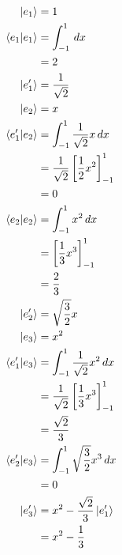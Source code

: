 \documentclass{article}
\begin{document}
\subsection{}

\begin{align*}
  \ket{e_1}           & = 1                                                        \\
  \braket{e_1 | e_1}  & = \int_{-1}^1 \,d x                                        \\
                      & = 2                                                        \\
  \ket{e_1'}          & = \frac{1}{\sqrt{2}}                                       \\
  \ket{e_2}           & = x                                                        \\
  \braket{e_1' | e_2} & = \int_{-1}^1 \frac{1}{\sqrt{2}} x \,d x                   \\
                      & = \frac{1}{\sqrt{2}} \left[ \frac{1}{2} x^2 \right]_{-1}^1 \\
                      & = 0                                                        \\
  \braket{e_2 | e_2}  & = \int_{-1}^1 x^2 \,d x                                    \\
                      & = \left[ \frac{1}{3} x^3 \right]_{-1}^1                    \\
                      & = \frac{2}{3}                                              \\
  \ket{e_2'}          & = \sqrt{\frac{3}{2}} x                                     \\
  \ket{e_3}           & = x^2                                                      \\
  \braket{e_1' | e_3} & = \int_{-1}^1 \frac{1}{\sqrt{2}} x^2 \,d x                 \\
                      & = \frac{1}{\sqrt{2}} \left[ \frac{1}{3} x^3 \right]_{-1}^1 \\
                      & = \frac{\sqrt{2}}{3}                                       \\
  \braket{e_2' | e_3} & = \int_{-1}^1 \sqrt{\frac{3}{2}} x^3 \,d x                 \\
                      & = 0                                                        \\
  \ket{e_3'}          & = x^2 - \frac{\sqrt{2}}{3} \ket{e_1'}                      \\
                      & = x^2 - \frac{1}{3}
\end{align*}
\end{document}
